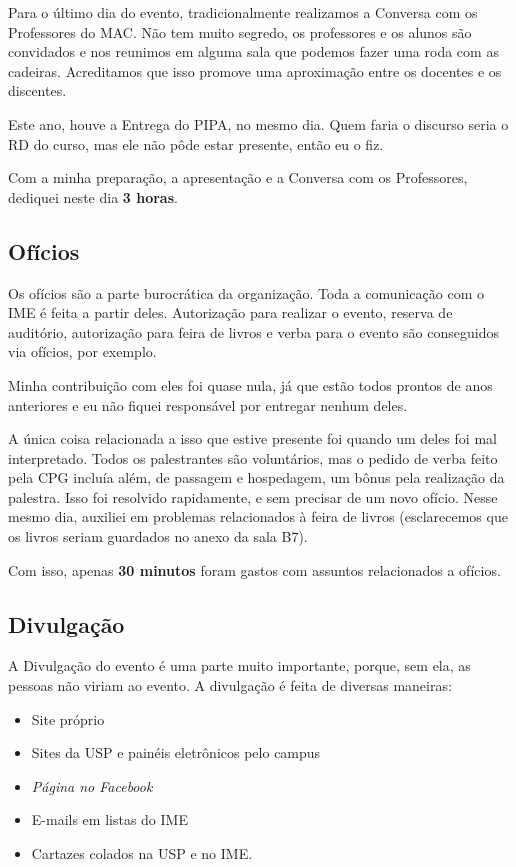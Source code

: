 \documentclass[12pt,letterpaper]{article}
\begin{document}
	Para o último dia do evento, tradicionalmente realizamos a Conversa com os Professores do MAC. Não tem muito segredo, os professores e os alunos são convidados e nos reunimos em alguma sala que podemos fazer uma roda com as cadeiras. Acreditamos que isso promove uma aproximação entre os docentes e os discentes.
	
	Este ano, houve a Entrega do PIPA, no mesmo dia. Quem faria o discurso seria o RD do curso, mas ele não pôde estar presente, então eu o fiz. 
	
	Com a minha preparação, a apresentação e a Conversa com os Professores, dediquei neste dia \textbf{3 horas}.
	
	\subsection{Ofícios}
	
	Os ofícios são a parte burocrática da organização. Toda a comunicação com o IME é feita a partir deles. Autorização para realizar o evento, reserva de auditório, autorização para feira de livros e verba para o evento são conseguidos via ofícios, por exemplo.
	
	Minha contribuição com eles foi quase nula, já que estão todos prontos de anos anteriores e eu não fiquei responsável por entregar nenhum deles.
	
	A única coisa relacionada a isso que estive presente foi quando um deles foi mal interpretado. Todos os palestrantes são voluntários, mas o pedido de verba feito pela CPG incluía além, de passagem e hospedagem, um bônus pela realização da palestra. Isso foi resolvido rapidamente, e sem precisar de um novo ofício. Nesse mesmo dia, auxiliei em problemas relacionados à feira de livros (esclarecemos que os livros seriam guardados no anexo da sala B7).
	
	Com isso, apenas \textbf{30 minutos} foram gastos com assuntos relacionados a ofícios.
	
	\subsection{Divulgação}
	
	A Divulgação do evento é uma parte muito importante, porque, sem ela, as pessoas não viriam ao evento. A divulgação é feita de diversas maneiras:
	
	\begin{itemize}
		\item Site próprio
		\item Sites da USP e painéis eletrônicos pelo campus
		\item \textit{Página no Facebook}
		\item E-mails em listas do IME
		\item Cartazes colados na USP e no IME.
	\end{itemize}
\end{document}
